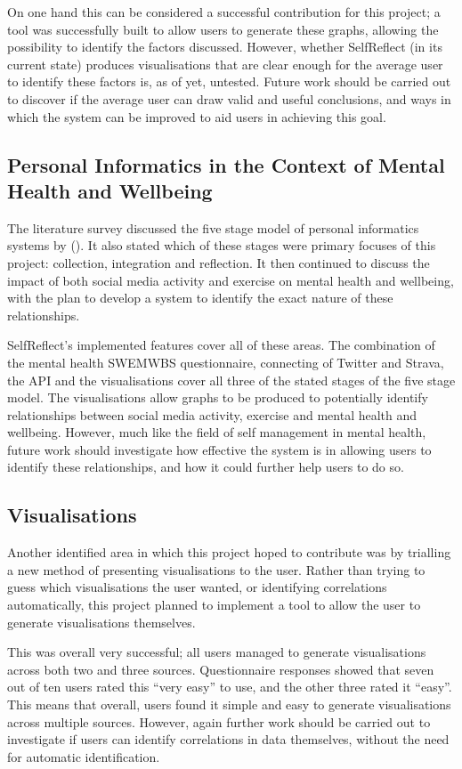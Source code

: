 \documentclass[11pt,openright,a4paper]{report}
\begin{document}
On one hand this can be considered a successful contribution for this project; a tool was successfully built to allow users to generate these graphs, allowing the possibility to identify the factors discussed. However, whether SelfReflect (in its current state) produces visualisations that are clear enough for the average user to identify these factors is, as of yet, untested. Future work should be carried out to discover if the average user can draw valid and useful conclusions, and ways in which the system can be improved to aid users in achieving this goal.

\subsection{Personal Informatics in the Context of Mental Health and Wellbeing}
The literature survey discussed the five stage model of personal informatics systems by \citeauthor{li2010stage} (\citeyear{li2010stage}). It also stated which of these stages were primary focuses of this project: collection, integration and reflection. It then continued to discuss the impact of both social media activity and exercise on mental health and wellbeing, with the plan to develop a system to identify the exact nature of these relationships.

SelfReflect's implemented features cover all of these areas. The combination of the mental health SWEMWBS questionnaire, connecting of Twitter and Strava, the API and the visualisations cover all three of the stated stages of the five stage model. The visualisations allow graphs to be produced to potentially identify relationships between social media activity, exercise and mental health and wellbeing. However, much like the field of self management in mental health, future work should investigate how effective the system is in allowing users to identify these relationships, and how it could further help users to do so.

\subsection{Visualisations}
Another identified area in which this project hoped to contribute was by trialling a new method of presenting visualisations to the user. Rather than trying to guess which visualisations the user wanted, or identifying correlations automatically, this project planned to implement a tool to allow the user to generate visualisations themselves.

This was overall very successful; all users managed to generate visualisations across both two and three sources. Questionnaire responses showed that seven out of ten users rated this \enquote{very easy} to use, and the other three rated it \enquote{easy}. This means that overall, users found it simple and easy to generate visualisations across multiple sources. However, again further work should be carried out to investigate if users can identify correlations in data themselves, without the need for automatic identification.
\end{document}
